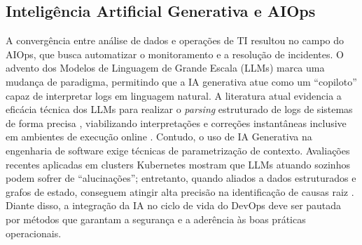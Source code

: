\subsection{Inteligência Artificial Generativa e AIOps}

A convergência entre análise de dados e operações de TI resultou no campo do AIOps, que busca automatizar o monitoramento e a resolução de incidentes. O advento dos Modelos de Linguagem de Grande Escala (LLMs) marca uma mudança de paradigma, permitindo que a IA generativa atue como um ``copiloto'' capaz de interpretar logs em linguagem natural. A literatura atual evidencia a eficácia técnica dos LLMs para realizar o \textit{parsing} estruturado de logs de sistemas de forma precisa \cite{beck2025}, viabilizando interpretações e correções instantâneas inclusive em ambientes de execução online \cite{zhangs2025}. Contudo, o uso de IA Generativa na engenharia de software exige técnicas de parametrização de contexto. Avaliações recentes aplicadas em clusters Kubernetes mostram que LLMs atuando sozinhos podem sofrer de ``alucinações''; entretanto, quando aliados a dados estruturados e grafos de estado, conseguem atingir alta precisão na identificação de causas raiz \cite{thota2026}. Diante disso, a integração da IA no ciclo de vida do DevOps deve ser pautada por métodos que garantam a segurança e a aderência às boas práticas operacionais.
